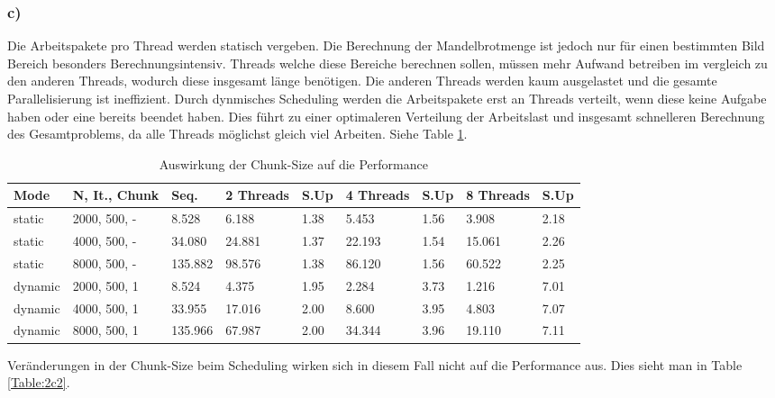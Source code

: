 \documentclass{report}
\begin{document}
		\subsubsection{c)}
			Die Arbeitspakete pro Thread werden statisch vergeben. 
			Die Berechnung der Mandelbrotmenge ist jedoch nur für einen bestimmten Bild Bereich besonders Berechnungsintensiv. 
			Threads welche diese Bereiche berechnen sollen, müssen mehr Aufwand betreiben im vergleich zu den anderen Threads, wodurch diese insgesamt länge benötigen.
			Die anderen Threads werden kaum ausgelastet und die gesamte Parallelisierung ist ineffizient.
			Durch dynmisches Scheduling werden die Arbeitspakete erst an Threads verteilt, wenn diese keine Aufgabe haben oder eine bereits beendet haben.
			Dies führt zu einer optimaleren Verteilung der Arbeitslast und insgesamt schnelleren Berechnung des Gesamtproblems, da alle Threads möglichst gleich viel Arbeiten. Siehe Table \ref{Table:2c}.
	
			\begin{table}
				\begin{tabular}{|p{1.5cm}|p{2cm}|p{1cm}|p{1cm}|p{1cm}|p{1cm}|p{1cm}|p{1cm}|p{1cm}|}
					\hline
					Mode & N, It., Chunk & Seq. & 2 Threads & S.Up & 4 Threads & S.Up & 8 Threads & S.Up \\
					\hline
					static & 2000, 500, - & 8.528  & 6.188  & 1.38 & 5.453  & 1.56 & 3.908  & 2.18\\
					static & 4000, 500, - & 34.080  & 24.881  & 1.37 & 22.193  & 1.54 & 15.061  & 2.26 \\
					static & 8000, 500, - & 135.882  & 98.576  & 1.38 & 86.120  & 1.56  & 60.522  & 2.25 \\
					\hline
					dynamic & 2000, 500, 1 & 8.524  & 4.375  & 1.95 & 2.284 & 3.73 & 1.216 & 7.01 \\
					dynamic & 4000, 500, 1 & 33.955  & 17.016 & 2.00 & 8.600 & 3.95 & 4.803 & 7.07 \\
					dynamic & 8000, 500, 1 & 135.966  & 67.987 & 2.00 & 34.344 & 3.96 & 19.110 & 7.11 \\
					\hline
				\end{tabular}
				\caption{Auswirkung der Chunk-Size auf die Performance}
				\label{Table:2c}
			\end{table}
			
			Veränderungen in der Chunk-Size beim Scheduling wirken sich in diesem Fall nicht auf die Performance aus. Dies sieht man in Table \ref{Table:2c2}.
			
\end{document}
